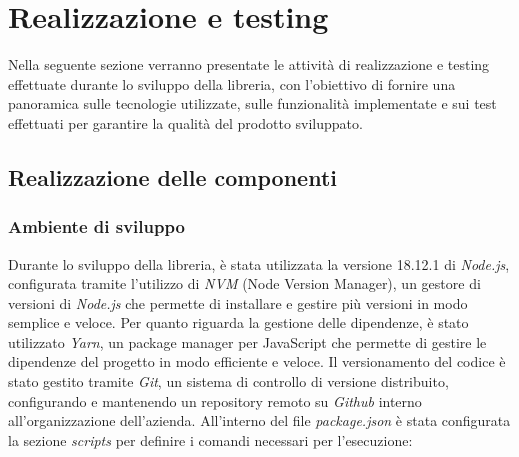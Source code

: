\chapter{Realizzazione e testing}
\label{chap:realizzazione-testing}
Nella seguente sezione verranno presentate le attività di realizzazione e testing effettuate durante lo sviluppo della libreria, con l'obiettivo di fornire una panoramica
sulle tecnologie utilizzate, sulle funzionalità implementate e sui test effettuati per garantire la qualità del prodotto sviluppato.

\section{Realizzazione delle componenti}

\subsection{Ambiente di sviluppo}
Durante lo sviluppo della libreria, è stata utilizzata la versione 18.12.1 di \textit{Node.js}, configurata tramite l'utilizzo di \textit{NVM}
(Node Version Manager), un gestore di versioni di \textit{Node.js} che permette di installare e gestire più versioni in modo semplice
e veloce. \newline
Per quanto riguarda la gestione delle dipendenze, è stato utilizzato \textit{Yarn}, un package manager per JavaScript che permette di gestire
le dipendenze del progetto in modo efficiente e veloce. \newline
Il versionamento del codice è stato gestito tramite \textit{Git}, un sistema di controllo di versione distribuito, configurando e
mantenendo un repository remoto su \textit{Github} interno all'organizzazione dell'azienda. \newline
All'interno del file \textit{package.json} è stata configurata la sezione \textit{scripts} per definire i comandi necessari per l'esecuzione:
